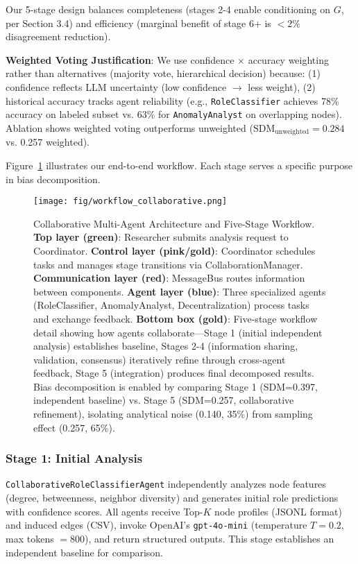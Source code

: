 \documentclass[conference]{IEEEtran}
\begin{document}
Our 5-stage design balances completeness (stages 2-4 enable conditioning on $G$, per Section 3.4) and efficiency (marginal benefit of stage 6+ is $<2\%$ disagreement reduction).

\textbf{Weighted Voting Justification}: We use confidence $\times$ accuracy weighting rather than alternatives (majority vote, hierarchical decision) because: (1) confidence reflects LLM uncertainty (low confidence $\rightarrow$ less weight), (2) historical accuracy tracks agent reliability (e.g., \texttt{RoleClassifier} achieves 78\% accuracy on labeled subset vs. 63\% for \texttt{AnomalyAnalyst} on overlapping nodes). Ablation shows weighted voting outperforms unweighted ($\text{SDM}_{\text{unweighted}} = 0.284$ vs. 0.257 weighted).

Figure~\ref{fig:collaborative-workflow} illustrates our end-to-end workflow. Each stage serves a specific purpose in bias decomposition.

\begin{figure}[htbp]
    \centering
    \texttt{[image: fig/workflow\_collaborative.png]}
    \caption{Collaborative Multi-Agent Architecture and Five-Stage Workflow. \textbf{Top layer (green)}: Researcher submits analysis request to Coordinator. \textbf{Control layer (pink/gold)}: Coordinator schedules tasks and manages stage transitions via CollaborationManager. \textbf{Communication layer (red)}: MessageBus routes information between components. \textbf{Agent layer (blue)}: Three specialized agents (RoleClassifier, AnomalyAnalyst, Decentralization) process tasks and exchange feedback. \textbf{Bottom box (gold)}: Five-stage workflow detail showing how agents collaborate---Stage 1 (initial independent analysis) establishes baseline, Stages 2-4 (information sharing, validation, consensus) iteratively refine through cross-agent feedback, Stage 5 (integration) produces final decomposed results. Bias decomposition is enabled by comparing Stage 1 (SDM=0.397, independent baseline) vs. Stage 5 (SDM=0.257, collaborative refinement), isolating analytical noise (0.140, 35\%) from sampling effect (0.257, 65\%).}
    \label{fig:collaborative-workflow}
\end{figure}

\subsubsection{Stage 1: Initial Analysis}
\texttt{CollaborativeRoleClassifierAgent} independently analyzes node features (degree, betweenness, neighbor diversity) and generates initial role predictions with confidence scores. All agents receive Top-$K$ node profiles (JSONL format) and induced edges (CSV), invoke OpenAI's \texttt{gpt-4o-mini} (temperature $T{=}0.2$, max tokens ${=}800$), and return structured outputs. This stage establishes an independent baseline for comparison.
\end{document}
